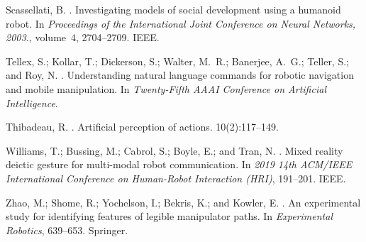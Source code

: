 \documentclass[letterpaper]{article} %
\begin{document}
\begin{thebibliography}{}
Scassellati, B.
.
\newblock Investigating models of social development using a humanoid robot.
\newblock In {\em Proceedings of the International Joint Conference on Neural
  Networks, 2003.}, volume~4,  2704--2709.
\newblock IEEE.

Tellex, S.; Kollar, T.; Dickerson, S.; Walter, M.~R.; Banerjee, A.~G.; Teller,
  S.; and Roy, N.
.
\newblock Understanding natural language commands for robotic navigation and
  mobile manipulation.
\newblock In {\em Twenty-Fifth AAAI Conference on Artificial Intelligence}.

Thibadeau, R.
.
\newblock Artificial perception of actions.
 10(2):117--149.

Williams, T.; Bussing, M.; Cabrol, S.; Boyle, E.; and Tran, N.
.
\newblock Mixed reality deictic gesture for multi-modal robot communication.
\newblock In {\em 2019 14th ACM/IEEE International Conference on Human-Robot
  Interaction (HRI)},  191--201.
\newblock IEEE.

Zhao, M.; Shome, R.; Yochelson, I.; Bekris, K.; and Kowler, E.
.
\newblock An experimental study for identifying features of legible manipulator
  paths.
\newblock In {\em Experimental Robotics},  639--653.
\newblock Springer.

\end{thebibliography}

\end{document}

